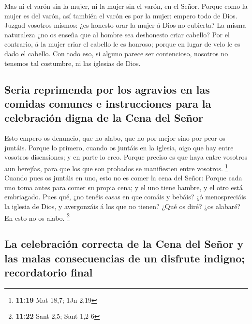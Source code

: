  Mas ni el varón sin la mujer, ni la mujer sin el varón, en
el Señor.  Porque como la mujer es del varón, así también
el varón es por la mujer: empero todo de Dios.  Juzgad
vosotros mismos: ¿es honesto orar la mujer á Dios no cubierta?
 La misma naturaleza ¿no os enseña que al hombre sea
deshonesto criar cabello?  Por el contrario, á la mujer
criar el cabello le es honroso; porque en lugar de velo le es dado el
cabello.  Con todo eso, si alguno parece ser contencioso,
nosotros no tenemos tal costumbre, ni las iglesias de Dios.

\hypertarget{seria-reprimenda-por-los-agravios-en-las-comidas-comunes-e-instrucciones-para-la-celebraciuxf3n-digna-de-la-cena-del-seuxf1or}{%
\subsection{Seria reprimenda por los agravios en las comidas comunes e
instrucciones para la celebración digna de la Cena del
Señor}\label{seria-reprimenda-por-los-agravios-en-las-comidas-comunes-e-instrucciones-para-la-celebraciuxf3n-digna-de-la-cena-del-seuxf1or}}

 Esto empero os denuncio, que no alabo, que no por mejor
sino por peor os juntáis.  Porque lo primero, cuando os
juntáis en la iglesia, oigo que hay entre vosotros disensiones; y en
parte lo creo.  Porque preciso es que haya entre vosotros
aun herejías, para que los que son probados se manifiesten entre
vosotros. \footnote{\textbf{11:19} Mat 18,7; 1Jn 2,19} 
Cuando pues os juntáis en uno, esto no es comer la cena del Señor:
 Porque cada uno toma antes para comer su propia cena; y el
uno tiene hambre, y el otro está embriagado.  Pues qué, ¿no
tenéis casas en que comáis y bebáis? ¿ó menospreciáis la iglesia de
Dios, y avergonzáis á los que no tienen? ¿Qué os diré? ¿os alabaré? En
esto no os alabo. \footnote{\textbf{11:22} Sant 2,5; Sant 1,2-6}

\hypertarget{la-celebraciuxf3n-correcta-de-la-cena-del-seuxf1or-y-las-malas-consecuencias-de-un-disfrute-indigno-recordatorio-final}{%
\subsection{La celebración correcta de la Cena del Señor y las malas
consecuencias de un disfrute indigno; recordatorio
final}\label{la-celebraciuxf3n-correcta-de-la-cena-del-seuxf1or-y-las-malas-consecuencias-de-un-disfrute-indigno-recordatorio-final}}

